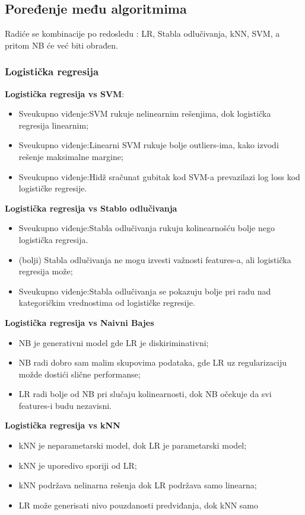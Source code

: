 \documentclass[fontsize=12bp, paper=a4]{scrarticle}
\begin{document}
\subsection{Poređenje među algoritmima\cite{comp1a}\cite{1b}}

Radiće se kombinacije po redosledu : LR, Stabla odlučivanja, kNN, SVM, a pritom NB će već biti obrađen.

\subsubsection{Logistička regresija}
\textbf{Logistička regresija vs SVM}:
\begin{itemize}
    \item Sveukupno viđenje:SVM rukuje nelinearnim rešenjima, dok logistička regresija linearnim;
    \item Sveukupno viđenje:Linearni SVM rukuje bolje outliers-ima, kako izvodi rešenje maksimalne margine;
    \item Sveukupno viđenje:Hidž sračunat gubitak kod SVM-a prevazilazi log loss kod logističke regresije.
\end{itemize}

\textbf{Logistička regresija vs Stablo odlučivanja}
\begin{itemize}
    \item Sveukupno viđenje:Stabla odlučivanja rukuju kolinearnošću bolje nego logistička regresija.
    \item (bolji) Stabla odlučivanja ne mogu izvesti važnosti features-a, ali logistička regresija može;
    \item Sveukupno viđenje:Stabla odlučivanja se pokazuju bolje pri radu nad kategoričkim vrednostima od logističke regresije.
\end{itemize}

\textbf{Logistička regresija vs Naivni Bajes}
\begin{itemize}
    \item NB je generativni model gde LR je diskiriminativni;
    \item NB radi dobro sam malim skupovima podataka, gde LR uz regularizaciju možde dostići slične performanse;
    \item LR radi bolje od NB pri slučaju kolinearnosti, dok NB očekuje da svi features-i budu nezavisni.
\end{itemize}

\textbf{Logistička regresija vs kNN}
\begin{itemize}
    \item kNN je neparametarski model, dok LR je parametarski model;
    \item kNN je uporedivo sporiji od LR;
    \item kNN podržava nelinarna rešenja dok LR podržava samo linearna;
    \item LR može generisati nivo pouzdanosti predviđanja, dok kNN samo 
\end{itemize}
\end{document}
